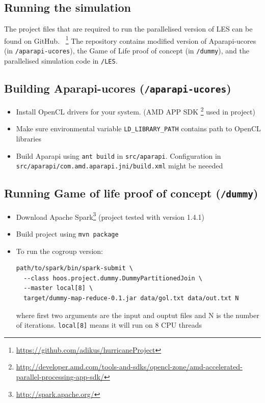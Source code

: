 \documentclass{l4proj}
\begin{document}
\begin{appendices}

\chapter{Running the simulation}
\label{chap:running}

The project files that are required to run the parallelised version of LES can be found on GitHub.
~\footnote{\url{https://github.com/adikus/hurricaneProject}}
The repository contains modified version of Aparapi-ucores (in \texttt{/aparapi-ucores}), 
the Game of Life proof of concept (in \texttt{/dummy}),
and the parallelised simulation code in \texttt{/LES}.

\section{Building Aparapi-ucores (\texttt{/aparapi-ucores})}

\begin{itemize}
\item Install OpenCL drivers for your system. (AMD APP SDK
\footnote{\url{http://developer.amd.com/tools-and-sdks/opencl-zone/amd-accelerated-parallel-processing-app-sdk/}} 
used in project)
\item Make sure environmental variable \texttt{LD\_LIBRARY\_PATH} contains path to OpenCL libraries
\item Build Aparapi using \texttt{ant build} in \texttt{src/aparapi}. Configuration in \\
\texttt{src/aparapi/com.amd.aparapi.jni/build.xml} might be neeeded
\end{itemize}

\section{Running Game of life proof of concept (\texttt{/dummy})}

\begin{itemize}
\item Download Apache Spark\footnote{\url{http://spark.apache.org/}} (project tested with version 1.4.1)
\item Build project using \texttt{mvn package}
\item To run the cogroup version:
\begin{verbatim}
path/to/spark/bin/spark-submit \
  --class hoos.project.dummy.DummyPartitionedJoin \
  --master local[8] \
  target/dummy-map-reduce-0.1.jar data/gol.txt data/out.txt N
\end{verbatim}
where first two arguments are the input and ouptut files and N is the number of iterations.
\texttt{local[8]} means it will run on 8 CPU threads
\end{itemize}


\end{appendices}
\end{document}
